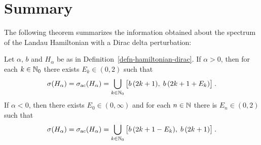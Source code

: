 \section{Summary}
The following theorem summarizes the information obtained about the spectrum of the Landau Hamiltonian with a Dirac delta perturbation:
\begin{thm}
    Let $\alpha, \, b$ and $H_\alpha$ be as in Definition~\ref{defn-hamiltonian-dirac}. If $\alpha>0$, then for each $k \in \mathbb{N}_0$ there exists $E_k \in (0, 2)$ such that
    \begin{equation*}
        \sigma(H_\alpha) = \sigma_{\mathrm{ac}}(H_\alpha) =
        \bigcup_{k \in \mathbb{N}_0}
        \big[ b \, (2k+1), \; b \, (2k+1+E_k) \big]
        \: .
    \end{equation*}
    If $\alpha<0$, then there exists $E_0 \in (0, \infty)$ and for each $n \in \mathbb{N}$ there is $E_n \in (0, 2)$ such that
    \begin{equation*}
        \sigma(H_\alpha) = \sigma_{\mathrm{ac}}(H_\alpha) =
        \bigcup_{k \in \mathbb{N}_0}
        \big[ b \, (2k+1-E_k), \; b \, (2k+1) \big]
        \: .
    \end{equation*}
\end{thm}
